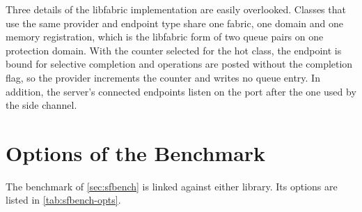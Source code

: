 Three details of the libfabric implementation are easily overlooked. Classes that
use the same provider and endpoint type share one fabric, one domain and one
memory registration, which is the libfabric form of two queue pairs on one
protection domain. With the counter selected for the hot class, the endpoint
is bound for selective completion and operations are posted without the
completion flag, so the provider increments the counter and writes no queue
entry. In addition, the server's connected endpoints listen on the port after the one
used by the side channel.

\section{Options of the Benchmark}

The benchmark of \cref{sec:sfbench} is linked against either library. Its
options are listed in \cref{tab:sfbench-opts}.

